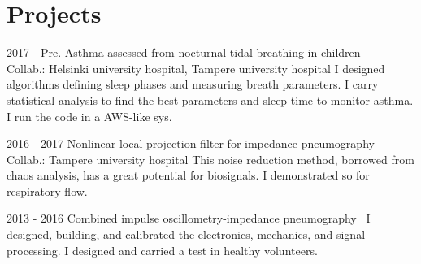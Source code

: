\documentclass[letterpaper]{twentysecondcv} %
\begin{document}
\section{Projects}
\begin{twenty} %
	\twentyitem
    	{2017 - Pre.}
        {Asthma assessed from nocturnal tidal breathing in children~\cite{children,infants}}
        {\\Collab.: Helsinki university hospital, Tampere university hospital }
        {\normalsize 
        I designed algorithms defining sleep phases and measuring breath parameters. I carry statistical analysis to find the best parameters and sleep time to monitor asthma. I run the code in a AWS-like sys.}
        {}

	\twentyitem
    	{2016 - 2017}
        {Nonlinear local projection filter for impedance pneumography~\cite{nlpf}}
        {\\Collab.: Tampere university hospital }
        {\normalsize
		This noise reduction method, borrowed from chaos analysis, has a great potential for biosignals. I demonstrated so for respiratory flow. }
        {}  
  
  \twentyitem
    	{2013 - 2016}
        {Combined impulse oscillometry-impedance pneumography~\cite{iosj,multi}}
        {}
        {\normalsize
        I designed, building, and calibrated the electronics, mechanics, and signal processing. I designed and carried a test in healthy volunteers.}
        {     }     
        
\end{twenty} 






\end{document}
